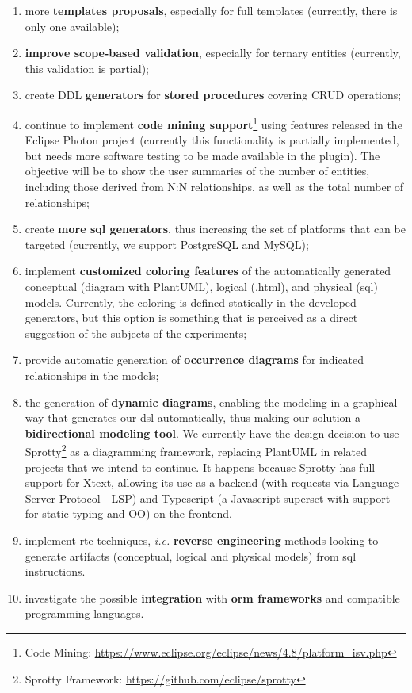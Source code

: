 \begin{enumerate} [label=\roman*.]
    \item more \textbf{templates proposals}, especially for full templates (currently, there is only one available);
    \item \textbf{improve scope-based validation}, especially for ternary entities (currently, this validation is partial);
    \item create DDL \textbf{generators} for \textbf{stored procedures} covering CRUD operations;
    \item continue to implement \textbf{code mining support}\footnote {Code Mining: \url{https://www.eclipse.org/eclipse/news/4.8/platform_isv.php}} using features released in the Eclipse Photon project (currently this functionality is partially implemented, but needs more software testing to be made available in the plugin).
    The objective will be to show the user summaries of the number of entities, including those derived from N:N relationships, as well as the total number of relationships;
    \item create \textbf{more \ac{sql} generators}, thus increasing the set of platforms that can be targeted (currently, we support PostgreSQL and MySQL);
    \item implement \textbf{customized coloring features} of the automatically generated conceptual (diagram with PlantUML), logical (.html), and physical (\ac{sql}) models. Currently, the coloring is defined statically in the developed generators, but this option is something that is perceived as a direct suggestion of the subjects of the experiments;
    \item provide automatic generation of \textbf{occurrence diagrams} for indicated relationships in the models;
    \item the generation of \textbf{dynamic diagrams}, enabling the modeling in a graphical way that generates our \ac{dsl} automatically, thus making our solution a \textbf{bidirectional modeling tool}. We currently have the design decision to use Sprotty\footnote{Sprotty Framework: \url{https://github.com/eclipse/sprotty}} as a diagramming framework, replacing PlantUML in related projects that we intend to continue. It happens because Sprotty has full support for Xtext, allowing its use as a backend (with requests via Language Server Protocol - LSP) and Typescript (a Javascript superset with support for static typing and OO) on the frontend.
    \item implement \ac{rte} techniques, \textit{i.e.} \textbf{reverse engineering} methods looking to generate artifacts (conceptual, logical and physical models) from \ac{sql} instructions.
     \item investigate the possible \textbf{integration} with \textbf{\ac{orm} frameworks} and compatible programming languages.
\end{enumerate}

